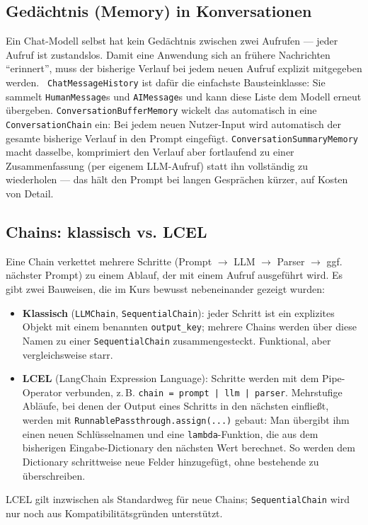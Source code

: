 \subsection{Gedächtnis (Memory) in Konversationen}

Ein Chat-Modell selbst hat kein Gedächtnis zwischen zwei Aufrufen --- jeder Aufruf ist
zustandslos. Damit eine Anwendung sich an frühere Nachrichten \enquote{erinnert}, muss der
bisherige Verlauf bei jedem neuen Aufruf explizit mitgegeben werden. \texttt{
ChatMessageHistory} ist dafür die einfachste Bausteinklasse: Sie sammelt
\texttt{HumanMessage}s und \texttt{AIMessage}s und kann diese Liste dem Modell erneut
übergeben. \texttt{ConversationBufferMemory} wickelt das automatisch in eine
\texttt{ConversationChain} ein: Bei jedem neuen Nutzer-Input wird automatisch der
gesamte bisherige Verlauf in den Prompt eingefügt.
\texttt{ConversationSummaryMemory} macht dasselbe, komprimiert den Verlauf aber
fortlaufend zu einer Zusammenfassung (per eigenem LLM-Aufruf) statt ihn vollständig zu
wiederholen --- das hält den Prompt bei langen Gesprächen kürzer, auf Kosten von Detail.

\subsection{Chains: klassisch vs. LCEL}

Eine Chain verkettet mehrere Schritte (Prompt $\rightarrow$ LLM $\rightarrow$ Parser
$\rightarrow$ ggf. nächster Prompt) zu einem Ablauf, der mit einem Aufruf ausgeführt
wird. Es gibt zwei Bauweisen, die im Kurs bewusst nebeneinander gezeigt wurden:
\begin{itemize}
    \item \textbf{Klassisch} (\texttt{LLMChain}, \texttt{SequentialChain}): jeder
          Schritt ist ein explizites Objekt mit einem benannten \texttt{output\_key};
          mehrere Chains werden über diese Namen zu einer \texttt{SequentialChain}
          zusammengesteckt. Funktional, aber vergleichsweise starr.
    \item \textbf{LCEL} (LangChain Expression Language): Schritte werden mit dem
          Pipe-Operator verbunden, z.\,B. \texttt{chain = prompt | llm | parser}.
          Mehrstufige Abläufe, bei denen der Output eines Schritts in den nächsten
          einfließt, werden mit \texttt{RunnablePassthrough.assign(...)} gebaut: Man übergibt
          ihm einen neuen Schlüsselnamen und eine \texttt{lambda}-Funktion, die aus dem
          bisherigen Eingabe-Dictionary den nächsten Wert berechnet. So werden dem
          Dictionary schrittweise neue Felder hinzugefügt, ohne bestehende zu überschreiben.
\end{itemize}
LCEL gilt inzwischen als Standardweg für neue Chains; \texttt{SequentialChain} wird nur
noch aus Kompatibilitätsgründen unterstützt.

